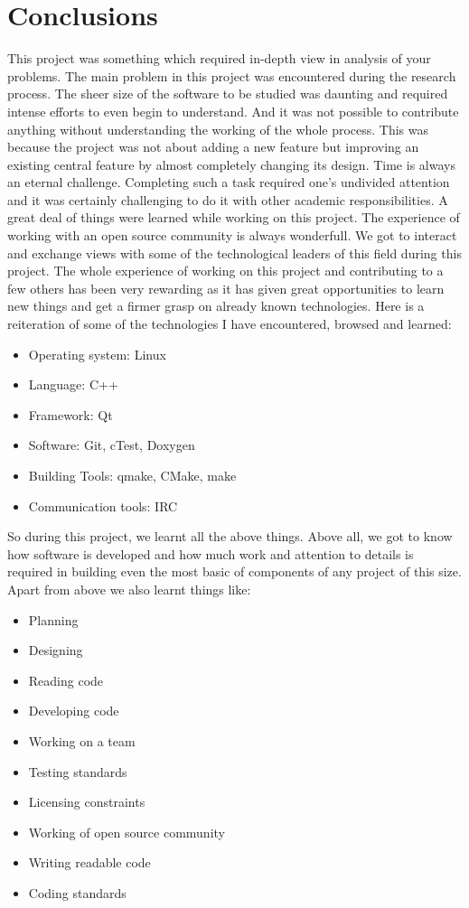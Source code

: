\section{Conclusions}
This project was something which required in-depth view in analysis of your problems. The main problem in this project was encountered during the research process. The sheer size of the software to be studied was daunting and required intense efforts to even begin to understand. And it was not possible to contribute anything without understanding the working of the whole process. This was because the project was not about adding a new feature but improving an existing central feature by almost completely changing its design. Time is always an eternal challenge. Completing such a task required one's undivided attention and it was certainly challenging to do it with other academic responsibilities.
A great deal of things were learned while working on this project. The experience of working with an open source community is always wonderfull. We got to interact and exchange views with some of the technological leaders of this field during this project.
The whole experience of working on this project and contributing to a few others has been very rewarding as it has given great opportunities to learn new things and get a firmer grasp on already known technologies. Here is a reiteration of some of the technologies I have encountered, browsed and learned:
\begin{itemize}
	\item Operating system: Linux
	\item Language: C++
	\item Framework: Qt
	\item Software: Git, cTest, Doxygen
	\item Building Tools: qmake, CMake, make
	\item Communication tools: IRC
\end{itemize}
So during this project, we learnt all the above things. Above all, we got to know how software is developed and how much work and attention to details is required in building even the most basic of components of any project of this size. Apart from above we also learnt things like:
\begin{itemize}
	\item Planning
	\item Designing
	\item Reading code
	\item Developing code
	\item Working on a team
	\item Testing standards
	\item Licensing constraints
	\item Working of open source community
	\item Writing readable code
	\item Coding standards
\end{itemize}
